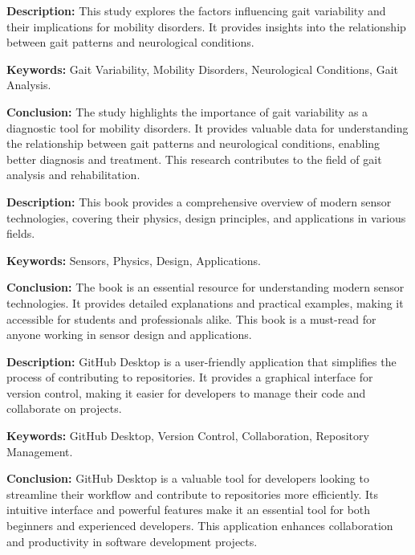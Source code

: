 {
	\textbf{Description:} This study explores the factors influencing gait variability and their implications for mobility disorders. It provides insights into the relationship between gait patterns and neurological conditions.
	\newline
	
	\textbf{Keywords:} Gait Variability, Mobility Disorders, Neurological Conditions, Gait Analysis.
	
	\newpage
	\textbf{Conclusion:} The study highlights the importance of gait variability as a diagnostic tool for mobility disorders. It provides valuable data for understanding the relationship between gait patterns and neurological conditions, enabling better diagnosis and treatment. This research contributes to the field of gait analysis and rehabilitation\cite{David:2020}.
}

{
	\textbf{Description:} This book provides a comprehensive overview of modern sensor technologies, covering their physics, design principles, and applications in various fields.
	\newline
	
	\textbf{Keywords:} Sensors, Physics, Design, Applications.
	
	\newpage
	\textbf{Conclusion:} The book is an essential resource for understanding modern sensor technologies. It provides detailed explanations and practical examples, making it accessible for students and professionals alike. This book is a must-read for anyone working in sensor design and applications\cite{fraden:2016}.
}

{
	\textbf{Description:} GitHub Desktop is a user-friendly application that simplifies the process of contributing to repositories. It provides a graphical interface for version control, making it easier for developers to manage their code and collaborate on projects.
	\newline
	
	\textbf{Keywords:} GitHub Desktop, Version Control, Collaboration, Repository Management.
	
	\newpage
	\textbf{Conclusion:} GitHub Desktop is a valuable tool for developers looking to streamline their workflow and contribute to repositories more efficiently. Its intuitive interface and powerful features make it an essential tool for both beginners and experienced developers. This application enhances collaboration and productivity in software development projects\cite{GitHubDesktop}.
}

